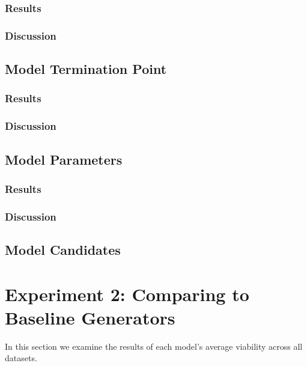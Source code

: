 \documentclass[12pt,a4paper]{report}
\begin{document}
\subsubsection{Results}

\subsubsection{Discussion}

\subsection{Model Termination Point}
\subsubsection{Results}

\subsubsection{Discussion}

\subsection{Model Parameters}
\subsubsection{Results}

\subsubsection{Discussion}

\subsection{Model Candidates}




\section{Experiment 2: Comparing to Baseline Generators}
\label{sec:experiment2}
In this section we examine the results of each model's average viability across all datasets. 
\end{document}

